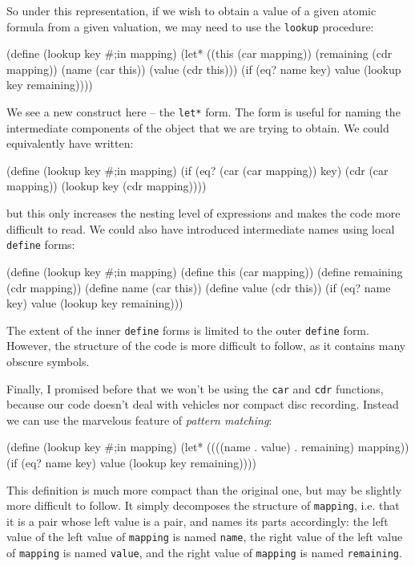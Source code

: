 So under this representation, if we wish to obtain a value
of a given atomic formula from a given valuation, we may need
to use the \texttt{lookup} procedure:

\begin{Snippet}
(define (lookup key #;in mapping)
  (let* ((this (car mapping))
         (remaining (cdr mapping))
         (name (car this))
         (value (cdr this)))
    (if (eq? name key)
      value
      (lookup key remaining))))
\end{Snippet}

We see a new construct here -- the \texttt{let*} form.
The form is useful for naming the intermediate components
of the object that we are trying to obtain. We could equivalently
have written:

\begin{Snippet}
(define (lookup key #;in mapping)
  (if (eq? (car (car mapping)) key)
    (cdr (car mapping))
    (lookup key (cdr mapping))))
\end{Snippet}

but this only increases the nesting level of expressions and makes
the code more difficult to read. We could also have introduced
intermediate names using local \texttt{define} forms:

\begin{Snippet}
(define (lookup key #;in mapping)
  (define this (car mapping))
  (define remaining (cdr mapping))
  (define name (car this))
  (define value (cdr this))
  (if (eq? name key)
    value
    (lookup key remaining)))
\end{Snippet}

The extent of the inner \texttt{define} forms is limited
to the outer \texttt{define} form. However, the structure
of the code is more difficult to follow, as it contains
many obscure symbols.

Finally, I promised before that we won't be using the
\texttt{car} and \texttt{cdr} functions, because our code
doesn't deal with vehicles nor compact disc recording. Instead
we can use the marvelous feature of \textit{pattern matching}:

\begin{Snippet}
(define (lookup key #;in mapping)
  (let* ((((name . value) . remaining) mapping))
    (if (eq? name key)
      value
      (lookup key remaining))))
\end{Snippet}

This definition is much more compact than the original one,
but may be slightly more difficult to follow. It simply
decomposes the structure of \texttt{mapping}, i.e. that
it is a pair whose left value is a pair, and names
its parts accordingly: the left value of the left value
of \texttt{mapping} is named \texttt{name}, the right
value of the left value of \texttt{mapping} is named
\texttt{value}, and the right value of \texttt{mapping}
is named \texttt{remaining}.

